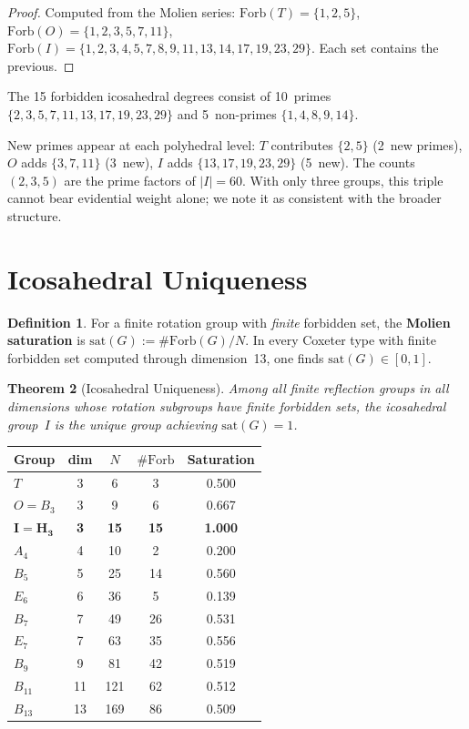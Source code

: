 \documentclass[11pt,letterpaper]{article}
\newtheorem{theorem}{Theorem}[section]
\theoremstyle{definition}
\newtheorem{definition}[theorem]{Definition}
\newcommand{\Forb}{\mathrm{Forb}}
\newcommand{\abs}[1]{\lvert #1 \rvert}
\begin{document}
\begin{proof}
Computed from the Molien series: $\Forb(T)=\{1,2,5\}$, $\Forb(O)=\{1,2,3,5,7,11\}$, $\Forb(I)=\{1,2,3,4,5,7,8,9,11,13,14,17,19,23,29\}$.  Each set contains the previous.
\end{proof}
The 15 forbidden icosahedral degrees consist of 10~primes $\{2,3,5,7,11,13,17,19,23,29\}$ and 5~non-primes $\{1,4,8,9,14\}$.
\begin{remarkbox}
New primes appear at each polyhedral level: $T$ contributes $\{2,5\}$ (2~new primes), $O$ adds $\{3,7,11\}$ (3~new), $I$ adds $\{13,17,19,23,29\}$ (5~new).  The counts $(2,3,5)$ are the prime factors of $\abs{I}=60$.  With only three groups, this triple cannot bear evidential weight alone; we note it as consistent with the broader structure.
\end{remarkbox}
\section{Icosahedral Uniqueness}\label{sec:optimum}
\begin{definition}\label{def:saturation}
For a finite rotation group with \emph{finite} forbidden set, the \textbf{Molien saturation} is $\mathrm{sat}(G):=\#\Forb(G)/N$.  In every Coxeter type with finite forbidden set computed through dimension~13, one finds $\mathrm{sat}(G)\in[0,1]$.
\end{definition}
\begin{theorem}[Icosahedral Uniqueness]\label{thm:unique}
Among all finite reflection groups in all dimensions whose rotation subgroups have finite forbidden sets, the icosahedral group~$I$ is the unique group achieving $\mathrm{sat}(G)=1$.
\end{theorem}
\begin{center}
\begin{tabular}{lcccc}
\toprule
Group & dim & $N$ & $\#\Forb$ & Saturation \\
\midrule
$T$ & 3 & 6 & 3 & 0.500 \\
$O=B_3$ & 3 & 9 & 6 & 0.667 \\
$\mathbf{I=H_3}$ & \textbf{3} & \textbf{15} & \textbf{15} & \textbf{1.000} \\
$A_4$ & 4 & 10 & 2 & 0.200 \\
$B_5$ & 5 & 25 & 14 & 0.560 \\
$E_6$ & 6 & 36 & 5 & 0.139 \\
$B_7$ & 7 & 49 & 26 & 0.531 \\
$E_7$ & 7 & 63 & 35 & 0.556 \\
$B_9$ & 9 & 81 & 42 & 0.519 \\
$B_{11}$ & 11 & 121 & 62 & 0.512 \\
$B_{13}$ & 13 & 169 & 86 & 0.509 \\
\bottomrule
\end{tabular}
\end{center}
\end{document}
